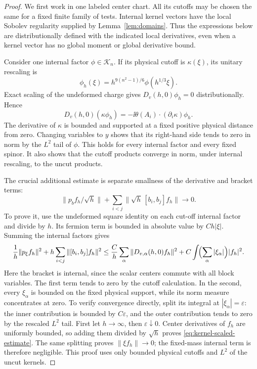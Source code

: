 \begin{proof}
We first work in one labeled center chart. All its cutoffs may be
chosen the same for a fixed finite family of tests. Internal kernel
vectors have the local Sobolev regularity supplied by
Lemma~\ref{lem:domains}. Thus the expressions below are distributionally
defined with the indicated local derivatives, even when a kernel
vector has no global moment or global derivative bound.

Consider one internal factor $\phi\in\mathcal K_n$. If its physical
cutoff is $\kappa(\xi)$, its unitary rescaling is
\[
 \phi_h(\xi)=h^{9(n^2-1)/6}\phi(h^{1/3}\xi).
\]
Exact scaling of the undeformed charge gives
$D_v(h,0)\phi_h=0$ distributionally. Hence
\[
 D_v(h,0)(\kappa\phi_h)
       =-\ii\theta(A_i)\cdot(\partial_i\kappa)\phi_h.
\]
The derivative of $\kappa$ is bounded and supported at a fixed
positive physical distance from zero. Changing variables to $y$
shows that its right-hand side tends to zero in norm by the $L^2$
tail of $\phi$. This holds for every internal factor and every
fixed spinor. It also shows that the cutoff products converge in
norm, under internal rescaling, to the uncut products.

The crucial additional estimate is separate smallness of the
derivative and bracket terms:
\begin{equation}
 \|p_b f_h/\sqrt h\|
       +\sum_{i<j}\|\sqrt h\,[b_i,b_j]f_h\|
          \longrightarrow0.
 \label{eq:kernel-scaled-estimate}
\end{equation}
To prove it, use the undeformed square identity on each cut-off
internal factor and divide by $h$. Its fermion term is bounded in
absolute value by $Ch|\xi|$. Summing the internal factors gives
\begin{equation}
 \frac1h\|p_\xi f_h\|^2
 +h\sum_{i<j}\|[b_i,b_j]f_h\|^2
 \leq\frac C h\sum_\alpha
           \|D_{v,\alpha}(h,0)f_h\|^2
           +C\int\!\Bigl(\sum_\alpha|\xi_\alpha|\Bigr)|f_h|^2.
 \label{lift:separate-energy}
\end{equation}
Here the bracket is internal, since the scalar centers commute
with all block variables. The first term tends to zero by the
cutoff calculation. In the second, every $\xi_\alpha$ is bounded
on the fixed physical support, while its norm measure concentrates
at zero. To verify convergence directly, split its integral at
$|\xi_\alpha|=\varepsilon$: the inner contribution is bounded by
$C\varepsilon$, and the outer contribution tends to zero by the
rescaled $L^2$ tail. First let $h\to\infty$, then
$\varepsilon\downarrow0$. Center derivatives of $f_h$ are uniformly
bounded, so adding them divided by $\sqrt h$ proves
\eqref{eq:kernel-scaled-estimate}. The same splitting proves
$\|\xi f_h\|\to0$; the fixed-mass internal term is therefore
negligible. This proof uses only bounded physical cutoffs and
$L^2$ of the uncut kernels.


\end{proof}
